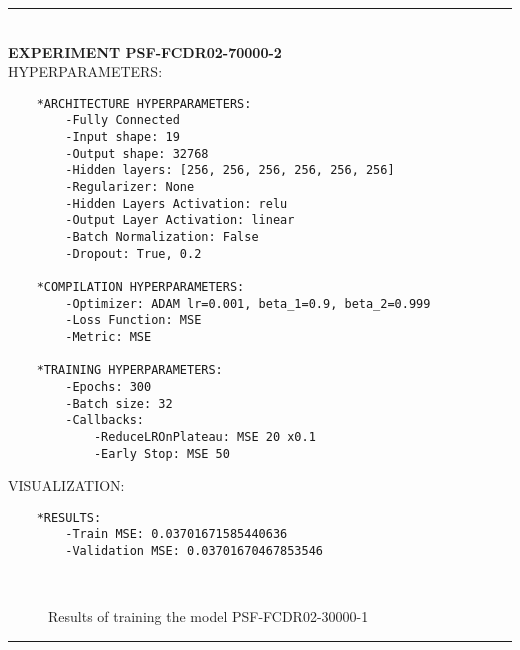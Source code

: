 \rule{0.5\textwidth}{0.5pt}\\

	{\large \textbf{EXPERIMENT PSF-FCDR02-70000-2}}\\
	
	{\normalsize HYPERPARAMETERS:}
	\begin{lstlisting}	
	*ARCHITECTURE HYPERPARAMETERS:
		-Fully Connected
		-Input shape: 19
		-Output shape: 32768
		-Hidden layers: [256, 256, 256, 256, 256, 256]
		-Regularizer: None
		-Hidden Layers Activation: relu
		-Output Layer Activation: linear
		-Batch Normalization: False
		-Dropout: True, 0.2
	
	*COMPILATION HYPERPARAMETERS:
		-Optimizer: ADAM lr=0.001, beta_1=0.9, beta_2=0.999
		-Loss Function: MSE
		-Metric: MSE
	
	*TRAINING HYPERPARAMETERS:
		-Epochs: 300
		-Batch size: 32
		-Callbacks: 
			-ReduceLROnPlateau: MSE 20 x0.1
			-Early Stop: MSE 50
	\end{lstlisting}
	
	{\normalsize VISUALIZATION:}
	\begin{lstlisting}
	*RESULTS:
        -Train MSE: 0.03701671585440636
        -Validation MSE: 0.03701670467853546
	\end{lstlisting}
	
	\begin{figure*}[ht!]
		\hspace{\fill}
		\hspace{\fill}
		\\
		\caption{Results of training the model PSF-FCDR02-30000-1}
	\end{figure*}
	
\FloatBarrier	
\rule{0.5\textwidth}{0.5pt}\\